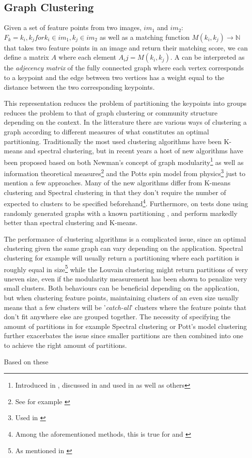 \documentclass{article}
\begin{document}
\subsection{Graph Clustering}

Given a set of feature points from two images, $im_1$ and $im_2$: $F_k = 
{k_i, k_j for k_i \in im_1, k_j \in im_2}$ as well as a matching 
function $M(k_i, k_j) \rightarrow \mathbb{N}$ that takes two feature 
points in an image and return their matching score, we can define a 
matrix $A$ where each element $A_ij = M(k_i, k_j)$. A can be interpreted 
as the \emph{adjecency matrix} of the fully connected graph where each 
vertex corresponds to a keypoint and the edge between two vertices has a 
weight equal to the distance between the two corresponding keypoints.

This representation reduces the problem of partitioning the keypoints 
into groups reduces the problem to that of graph clustering or community 
structure depending on the context. In the litterature there are various 
ways of clustering a graph according to different measures of what 
constitutes an optimal partitioning. Traditionally the most used 
clustering algorithms have been K-means and spectral clustering, but in 
recent years a host of new algorithms have been proposed based on both 
Newman's concept of graph modularity\footnote{Introduced in 
\cite{girvan2002}, discussed in \cite{brandes2007} and used in 
\cite{blondel2008} as well as others} as well as information theoretical 
measures\footnote{See for example \cite{rosvall2008}} and the Potts spin 
model from physics\footnote{Used in \cite{ronhovde2009}} just to mention 
a few approaches. Many of the new algorithms differ from K-means 
clustering and Spectral clustering in that they don't require the number 
of expected to clusters to be specified beforehand\footnote{Among the 
aforementioned methods, this is true for \cite{blondel2008} and 
\cite{rosvall2008}}.  Furthermore, on tests done using randomly 
generated graphs with a known partitioning \cite{blondel2008}, 
\cite{rosvall2008} and \cite{ronhovde2009} perform markedly better than 
spectral clustering and K-means\cite{lancichinetti2009}.

The performance of clustering algorithms is a complicated issue, since 
an optimal clustering given the same graph can vary depending on the 
application. Spectral clustering for example will usually return a 
partitioning where each partition is roughly equal in size\footnote{As 
mentioned in \cite{von2007}} while the Louvain 
clustering\cite{blondel2008} might return partitions of very uneven 
size, even if the modularity measurement has been shown to penalize very 
small clusters\cite{brandes2007}. Both behaviours can be beneficial 
depending on the application, but when clustering feature points, 
maintaining clusters of an even size usually means that a few clusters 
will be '\emph{catch-all}' clusters where the feature points that don't 
fit anywhere else are grouped together. The necessity of specifying the 
amount of partitions in for example Spectral clustering or Pott's model 
clustering further exacerbates the issue since smaller partitions are 
then combined into one to achieve the right amount of partitions.

Based on these 
\end{document}
